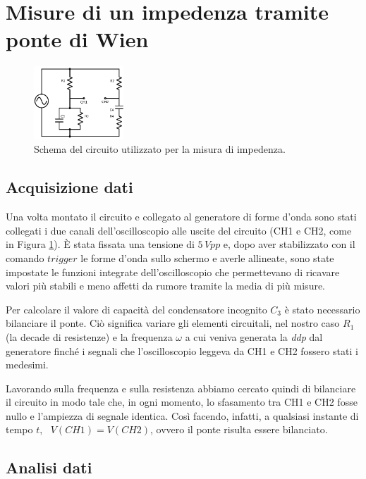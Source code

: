 \section{Misure di un impedenza tramite ponte di Wien}

\begin{figure}
	\centering
    \includegraphics[width=0.30\textwidth]{schema1.pdf}
    \caption{Schema del circuito utilizzato per la misura di impedenza.}
    \label{fig:circuito1}
\end{figure}

\subsection{Acquisizione dati}
Una volta montato il circuito e collegato al generatore di forme d'onda sono stati collegati i due canali dell'oscilloscopio alle uscite del circuito (CH1 e CH2, come in Figura \ref{fig:circuito1}). 
\`E stata fissata una tensione di $5\,Vpp$ e, dopo aver stabilizzato con il comando $trigger$ le forme d'onda sullo schermo e averle allineate, sono state impostate le funzioni integrate dell'oscilloscopio che permettevano di ricavare valori più stabili e meno affetti da rumore tramite la media di più misure.

Per calcolare il valore di capacità del condensatore incognito $C_3$ è stato necessario bilanciare il ponte. Ciò significa variare gli elementi circuitali, nel nostro caso $R_1$ (la decade di resistenze) e la frequenza $\omega$ a cui veniva generata la \emph{ddp} dal generatore finché i segnali che l'oscilloscopio leggeva da CH1 e CH2 fossero stati i medesimi.

Lavorando sulla frequenza e sulla resistenza abbiamo cercato quindi di bilanciare il circuito in modo tale che, in ogni momento, lo sfasamento tra CH1 e CH2 fosse nullo e l'ampiezza di segnale identica. Così facendo, infatti, a qualsiasi instante di tempo $t, \,\,\,\, V(CH1)=V(CH2)$, ovvero il ponte risulta essere bilanciato. 

\subsection{Analisi dati}

